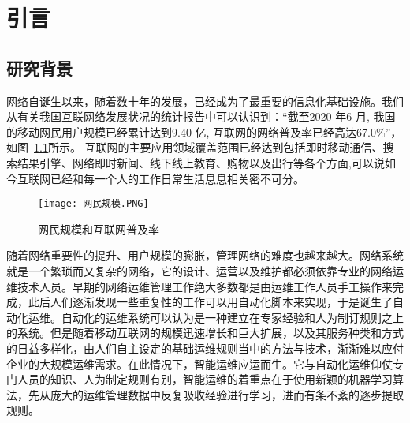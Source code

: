 
\chapter{引言}


\section{研究背景}

网络自诞生以来，随着数十年的发展，已经成为了最重要的信息化基础设施。我们从有关我国互联网络发展状况的统计报告\cite{cac.gov}中可以认识到：“截至2020 年6 月, 我国的移动网民用户规模已经累计达到9.40 亿, 互联网的网络普及率已经高达67.0\%”，如图~\ref{fig:网民规模和互联网普及率}所示。
互联网的主要应用领域覆盖范围已经达到包括即时移动通信、搜索结果引擎、网络即时新闻、线下线上教育、购物以及出行等各个方面,可以说如今互联网已经和每一个人的工作日常生活息息相关密不可分。



\begin{figure}
    \centering
    \texttt{[image: 网民规模.PNG]}
    \caption{网民规模和互联网普及率}
    \label{fig:网民规模和互联网普及率}
  \end{figure}

随着网络重要性的提升、用户规模的膨胀，管理网络的难度也越来越大。网络系统就是一个繁琐而又复杂的网络，它的设计、运营以及维护都必须依靠专业的网络运维技术人员。早期的网络运维管理工作绝大多数都是由运维工作人员手工操作来完成，此后人们逐渐发现一些重复性的工作可以用自动化脚本来实现，于是诞生了自动化运维。自动化的运维系统可以认为是一种建立在专家经验和人为制订规则之上的系统。但是随着移动互联网的规模迅速增长和巨大扩展，以及其服务种类和方式的日益多样化，由人们自主设定的基础运维规则当中的方法与技术，渐渐难以应付企业的大规模运维需求。在此情况下，智能运维应运而生。它与自动化运维仰仗专门人员的知识、人为制定规则有别，智能运维的着重点在于使用新颖的机器学习算法，先从庞大的运维管理数据中反复吸收经验进行学习，进而有条不紊的逐步提取规则。


